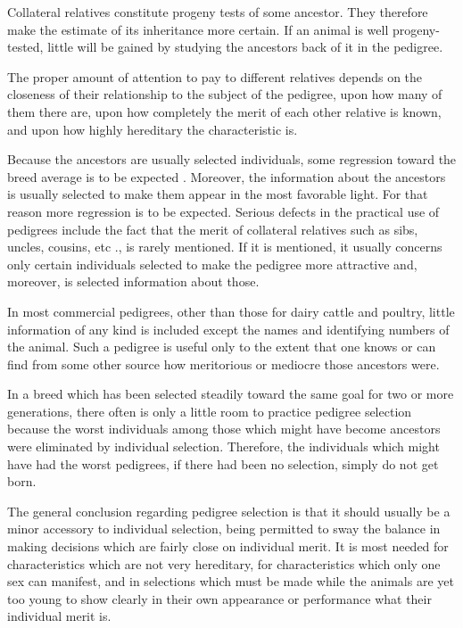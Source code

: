 Collateral relatives constitute progeny tests of some ancestor. They
therefore make the estimate of its inheritance more certain. If an animal
is well progeny-tested, little will be gained by studying the ancestors
back of it in the pedigree.

The proper amount of attention to pay to different relatives
depends on the closeness of their relationship to the subject of the pedigree,
upon how many of them there are, upon how completely the merit
of each other relative is known, and upon how highly hereditary the
characteristic is.
\nowidow

Because the ancestors are usually selected individuals, some regression
toward the breed average is to be expected . Moreover, the information
about the ancestors is usually selected to make them appear in the
most favorable light. For that reason more regression is to be expected.
Serious defects in the practical use of pedigrees include the fact that
the merit of collateral relatives such as sibs, uncles, cousins, etc ., is rarely
mentioned. If it is mentioned, it usually concerns only certain individuals
selected to make the pedigree more attractive and, moreover, is
selected information about those.

In most commercial pedigrees, other than those for dairy cattle and
poultry, little information of any kind is included except the names
and identifying numbers of the animal. Such a pedigree is useful only
to the extent that one knows or can find from some other source how
meritorious or mediocre those ancestors were.

In a breed which has been selected steadily toward the same goal for
two or more generations, there often is only a little room to practice
pedigree selection because the worst individuals among those which
might have become ancestors were eliminated by individual selection.
Therefore, the individuals which might have had the worst pedigrees, if
there had been no selection, simply do not get born.

The general conclusion regarding pedigree selection is that it should
usually be a minor accessory to individual selection, being permitted to
sway the balance in making decisions which are fairly close on individual
merit. It is most needed for characteristics which are not very
hereditary, for characteristics which only one sex can manifest, and
in selections which must be made while the animals are yet too young
to show clearly in their own appearance or performance what their
individual merit is.


